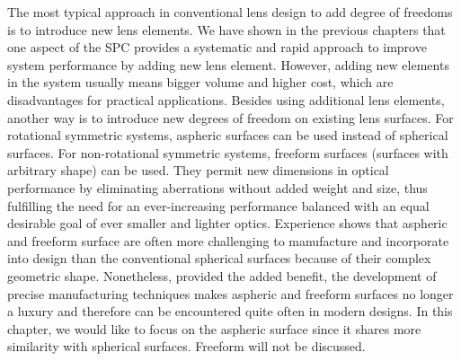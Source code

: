 The most typical approach in conventional lens design to add degree of freedoms is to introduce new lens elements. We have shown in the previous chapters that one aspect of the SPC provides a systematic and rapid approach to improve system performance by adding new lens element. However, adding new elements in the system usually means bigger volume and higher cost, which are disadvantages for practical applications. 
Besides using additional lens elements, another way is to introduce new degrees of freedom on existing lens surfaces. For rotational symmetric systems, aspheric surfaces can be used instead of spherical surfaces. For non-rotational symmetric systems, freeform surfaces (surfaces with arbitrary shape) can be used. They permit new dimensions in optical performance by eliminating aberrations without added weight and size, thus fulfilling the need for an ever-increasing performance balanced with an equal desirable goal of ever smaller and lighter optics. Experience shows that aspheric and freeform surface are often more challenging to manufacture and incorporate into design than the conventional spherical surfaces because of their complex geometric shape. Nonetheless, provided the added benefit, the development of precise manufacturing techniques makes aspheric and freeform surfaces no longer a luxury and therefore can be encountered quite often in modern designs. In this chapter, we would like to focus on the aspheric surface since it shares more similarity with spherical surfaces. Freeform will not be discussed. 


